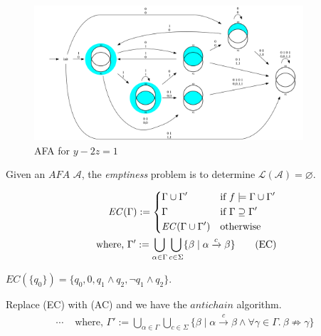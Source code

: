 \begin{example}
\begin{figure}
  \end{figure}
  \begin{figure}
    \caption{AFA for \( y -2z = 1 \)}
    \includegraphics[width=10cm]{images/afa_odd_x.png}
  \end{figure}
\end{example}
\iffalse
Given an \( \mathit{AFA}\) \( \mathcal{A} \), the \textit{emptiness} problem is
to determine \( \mathcal{L}(\mathcal{A}) = \varnothing \).

\begin{definition}
  \begin{align*}
    \mathit{EC}(\Gamma) :=
    \begin{dcases}
    \Gamma \cup \Gamma'              &\text{if } f \models \Gamma \cup \Gamma'
    \\
    \Gamma                           &\text{if } \Gamma \supseteq \Gamma'
    \\
    \mathit{EC}(\Gamma \cup \Gamma') &\text{otherwise } 
    \end{dcases}
    \\
    \text{ where, } \Gamma' :=
    \bigcup\limits_{\alpha \in \Gamma}
    \bigcup\limits_{c \in \Sigma}
    \{ \beta \mid \alpha \xrightarrow[]c \beta \}
    \tag{EC}
  \end{align*}
\end{definition}

\begin{example}
\( \mathit{EC}(\{ q_0 \}) = \{ q_0, 0, q_1 \wedge q_2, \neg q_1 \wedge q_2 \} \).
\end{example}

\begin{definition}
Replace (EC) with (AC) and we have the \( \mathit{antichain} \) algorithm. 
    \begin{align*} \cdots & \text{ where, } \Gamma' :=
    \bigcup\limits_{\alpha \in \Gamma}
    \bigcup\limits_{c \in \Sigma}
    \{
    \beta \mid \alpha \xrightarrow[]c \beta
    \wedge
    \forall \gamma \in \Gamma .\ \beta \not \Rightarrow \gamma
    \}
    \tag{AC}
    \end{align*}
\end{definition}

